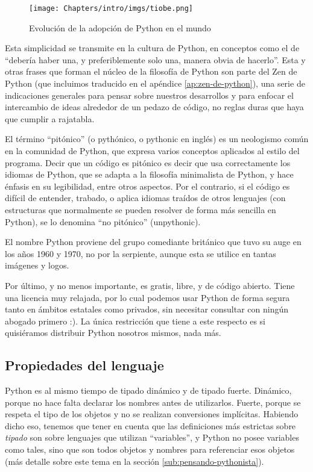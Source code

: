\begin{figure}
    \texttt{[image: Chapters/intro/imgs/tiobe.png]}
    \caption{Evolución de la adopción de Python en el mundo}
\end{figure}

Esta simplicidad se transmite en la cultura de Python, en conceptos como el de ``debería haber una, y preferiblemente solo una, manera obvia de hacerlo''. Esta y otras frases que forman el núcleo de la filosofía de Python son parte del Zen de Python \cite{zen-de-python} (que incluimos traducido en el apéndice \ref{ap:zen-de-python}), una serie de indicaciones generales para pensar sobre nuestros desarrollos y para enfocar el intercambio de ideas alrededor de un pedazo de código, no reglas duras que haya que cumplir a rajatabla.

El término ``pitónico'' (o pythónico, o pythonic en inglés) es un neologismo común en la comunidad de Python, que expresa varios conceptos aplicados al estilo del programa. Decir que un código es pitónico es decir que usa correctamente los idiomas de Python, que se adapta a la filosofía minimalista de Python, y hace énfasis en su legibilidad, entre otros aspectos. Por el contrario, si el código es difícil de entender, trabado, o aplica idiomas traídos de otros lenguajes (con estructuras que normalmente se pueden resolver de forma más sencilla en Python), se lo denomina ``no pitónico'' (unpythonic).

\begin{info}
El nombre Python proviene del grupo comediante británico que tuvo su auge en los años 1960 y 1970, no por la serpiente, aunque esta se utilice en tantas imágenes y logos.
\end{info}

Por último, y no menos importante, es gratis, libre, y de código abierto. Tiene una licencia muy relajada, por lo cual podemos usar Python de forma segura tanto en ámbitos estatales como privados, sin necesitar consultar con ningún abogado primero :). La única restricción que tiene a este respecto es si quisiéramos distribuir Python nosotros mismos, nada más.


\subsection{Propiedades del lenguaje}\label{intro--propiedades-del-lenguaje}

Python es al mismo tiempo de tipado dinámico y de tipado fuerte. Dinámico, porque no hace falta declarar los nombres antes de utilizarlos. Fuerte, porque se respeta el tipo de los objetos y no se realizan conversiones implícitas. Habiendo dicho eso, tenemos que tener en cuenta que las definiciones más estrictas sobre \textit{tipado} son sobre lenguajes que utilizan ``variables'', y Python no posee variables como tales, sino que son todos objetos y nombres para referenciar esos objetos (más detalle sobre este tema en la sección \ref{sub:pensando-pythonista}).

